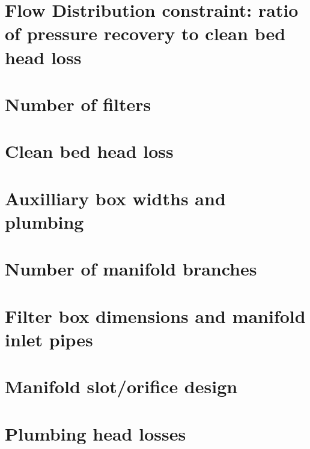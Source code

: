\documentclass[letterpaper,10pt,english]{sphinxmanual}
\begin{document}
\section{Flow Distribution constraint: ratio of pressure recovery to clean bed head loss}
\label{\detokenize{Filtration/Filtration_Design:flow-distribution-constraint-ratio-of-pressure-recovery-to-clean-bed-head-loss}}

\section{Number of filters}
\label{\detokenize{Filtration/Filtration_Design:number-of-filters}}

\section{Clean bed head loss}
\label{\detokenize{Filtration/Filtration_Design:clean-bed-head-loss}}

\section{Auxilliary box widths and plumbing}
\label{\detokenize{Filtration/Filtration_Design:auxilliary-box-widths-and-plumbing}}

\section{Number of manifold branches}
\label{\detokenize{Filtration/Filtration_Design:number-of-manifold-branches}}

\section{Filter box dimensions and manifold inlet pipes}
\label{\detokenize{Filtration/Filtration_Design:filter-box-dimensions-and-manifold-inlet-pipes}}

\section{Manifold slot/orifice design}
\label{\detokenize{Filtration/Filtration_Design:manifold-slot-orifice-design}}

\section{Plumbing head losses}
\label{\detokenize{Filtration/Filtration_Design:plumbing-head-losses}}
\end{document}
